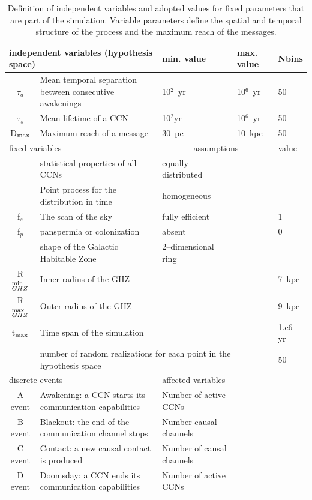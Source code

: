 \documentclass[crop]{CSLB}
\newcommand{\ceti}{CCN}
\newcommand{\cetis}{CCNs}
\begin{document}
 \setlength{\tabcolsep}{10pt}
\begin{table}
\centering
\begin{tabular}{cllll}
\hline
   \multicolumn{2}{l}{independent variables (hypothesis space)}
   &min. value&max. value&Nbins\\
\hline
   $\tau_{a}$ & Mean temporal separation between consecutive
   awakenings & 10$^2$~yr & 10$^6$~yr & 50\\ 
   $\tau_{s}$ & Mean lifetime of a \ceti{}
   & 10$^2$yr & 10$^6$~yr& 50\\ 
   D$_{\rm max}$ & Maximum reach of a message  & 30~pc & 10~kpc & 50 \\
\hline
   \multicolumn{2}{l}{fixed variables} & \multicolumn{2}{c}{assumptions} &value \\
\hline
   & statistical properties of all \cetis{} &equally distributed&&\\
   & Point process for the distribution in time & homogeneous &&\\
   f$_s$ & The scan of the sky & fully efficient&&1\\
   f$_p$ & panspermia or colonization &absent&&0\\
   & shape of the Galactic Habitable Zone & 2--dimensional ring &&\\
   R$_{GHZ}^{\rm min}$   & Inner radius of the GHZ     & & & 7~kpc\\
   R$_{GHZ}^{\rm max}$   & Outer radius of the GHZ     &&& 9~kpc\\
   t$_{\rm max}$ & Time span of the simulation  &&&1.e6 yr\\
    & \multicolumn{3}{l}{number of random realizations for each point in the hypothesis space} &50\\
\hline
   \multicolumn{2}{l}{discrete events} &
   \multicolumn{3}{l}{affected variables}\\
\hline
   A event & Awakening: a \ceti{} starts its communication
   capabilities &Number of active \cetis{}\\
   B event & Blackout: the end of the communication channel stops
   &Number causal channels\\
   C event & Contact: a new causal contact is produced &Number of causal channels\\
   D event & Doomsday: a \ceti{} ends its communication capabilities&Number of active \cetis{}\\
\hline

\hline
\end{tabular}
\caption{Definition of independent variables and adopted values for 
   fixed parameters 
   that are part of the simulation.  Variable parameters define the
   spatial and temporal structure
   of the process and the maximum reach of the messages.}
\label{T_simu_hypotheses}
\end{table}
 
\end{document}
